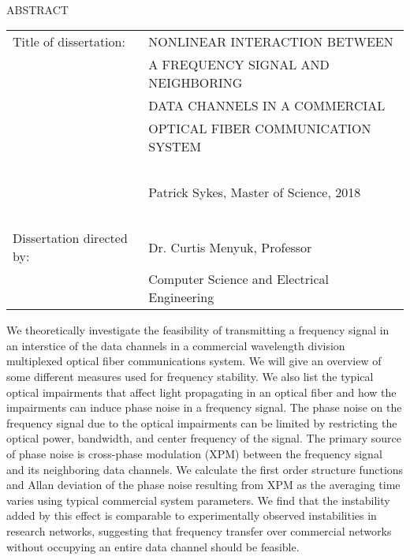 
\hbox{\ }

\renewcommand{\baselinestretch}{1}
\small \normalsize

\begin{center}
\large{{ABSTRACT}} 

\vspace{2em} 

\end{center}
\hspace{-.15in}
\begin{tabular}{ll}
Title of dissertation:    & {\large  NONLINEAR INTERACTION BETWEEN }\\
&				      {\large  A FREQUENCY SIGNAL AND NEIGHBORING} \\
&				      {\large  DATA CHANNELS IN A COMMERCIAL} \\
&				      {\large  OPTICAL FIBER COMMUNICATION SYSTEM} \\
\ \\
&                          {\large  Patrick Sykes, Master of Science, 2018} \\
\ \\
Dissertation directed by: & {\large  Dr. Curtis Menyuk, Professor} \\
&  				{\large	 Computer Science and Electrical Engineering} \\
\end{tabular}

\vspace{2em}

\renewcommand{\baselinestretch}{2}
\large \normalsize

We theoretically investigate the feasibility of transmitting a frequency signal in an interstice of the data channels in a commercial wavelength division multiplexed optical fiber communications system.  
We will give an overview of some different measures used for frequency stability. 
We also list the typical optical impairments that affect light propagating in an optical fiber and how the impairments can induce phase noise in a frequency signal.
The phase noise on the frequency signal due to the optical impairments can be limited by restricting the optical power, bandwidth, and center frequency of the signal.
The primary source of phase noise is cross-phase modulation (XPM) between the frequency signal and its neighboring data channels.
We calculate the first order structure functions and Allan deviation of the phase noise resulting from XPM as the averaging time varies using typical commercial system parameters. 
We find that the instability added by this effect is comparable to experimentally observed instabilities in research networks, suggesting that frequency transfer over commercial networks without occupying an entire data channel should be feasible.
